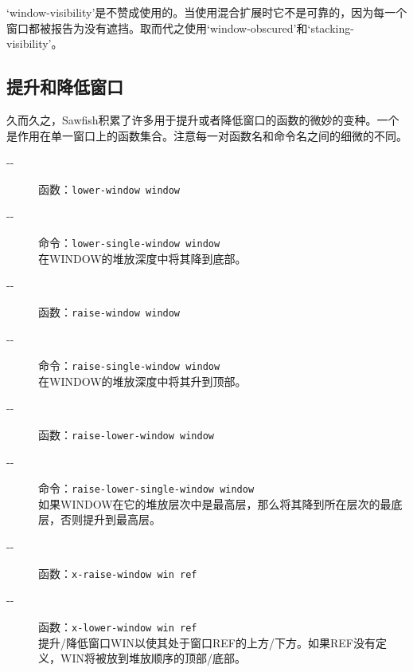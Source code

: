 \documentclass{book}
\begin{document}
\begin{CJK*}{UTF8}{gbsn}
\begin{description}
`window-visibility'是不赞成使用的。当使用混合扩展时它不是可靠的，因为每一个窗口都被报告为没有遮挡。取而代之使用`window-obscured'和`stacking-visibility'。
\end{description}
\subsection{提升和降低窗口}
久而久之，Sawfish积累了许多用于提升或者降低窗口的函数的微妙的变种。一个是作用在单一窗口上的函数集合。注意每一对函数名和命令名之间的细微的不同。
\begin{description}
\item[-{}-] 函数：\verb|lower-window window|\\
\item[-{}-] 命令：\verb|lower-single-window window|\\
在WINDOW的堆放深度中将其降到底部。
\item[-{}-] 函数：\verb|raise-window window|\\
\item[-{}-] 命令：\verb|raise-single-window window|\\
在WINDOW的堆放深度中将其升到顶部。
\item[-{}-] 函数：\verb|raise-lower-window window|\\
\item[-{}-] 命令：\verb|raise-lower-single-window window|\\
如果WINDOW在它的堆放层次中是最高层，那么将其降到所在层次的最底层，否则提升到最高层。
\item[-{}-] 函数：\verb|x-raise-window win ref|\\
\item[-{}-] 函数：\verb|x-lower-window win ref|\\
提升/降低窗口WIN以使其处于窗口REF的上方/下方。如果REF没有定义，WIN将被放到堆放顺序的顶部/底部。
\end{description}


\end{CJK*}
\end{document}
